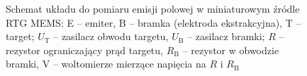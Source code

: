 \begin{figure}[htbp]
  \centering
  \resizebox{\textwidth}{!}{}
  \caption{Schemat układu do pomiaru emisji polowej w miniaturowym źródle RTG MEMS:
    E -- emiter, B -- bramka (elektroda ekstrakcyjna), T -- target;
    $U_\mathrm{T}$ -- zasilacz obwodu targetu, $U_\mathrm{B}$ -- zasilacz bramki;
    $R$ -- rezystor ograniczający prąd targetu, $R_\mathrm{B}$ -- rezystor w obwodzie bramki, V -- woltomierze mierzące napięcia na $R$ i $R_\mathrm{B}$}
  \label{fig:uklad-pomiarowy}
\end{figure}
